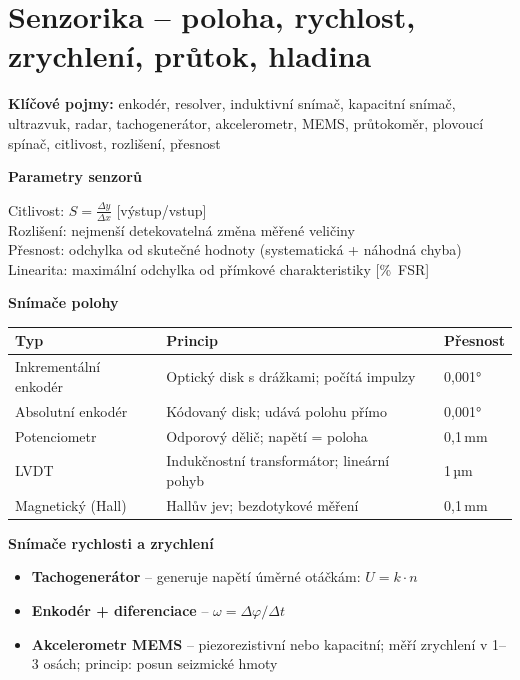 \documentclass[a4paper,10pt]{article}
\begin{document}
\section{Senzorika -- poloha, rychlost, zrychlení, průtok, hladina}

\begin{pojmybox}
\textbf{Klíčové pojmy:}
enkodér, resolver, induktivní snímač, kapacitní snímač,
ultrazvuk, radar, tachogenerátor, akcelerometr, MEMS,
průtokoměr, plovoucí spínač, citlivost, rozlišení, přesnost
\end{pojmybox}

\begin{vysvetlenibox}
\textbf{Parametry senzorů}

\begin{vzorcebox}
Citlivost: $S = \frac{\Delta y}{\Delta x}$ [výstup/vstup]\\
Rozlišení: nejmenší detekovatelná změna měřené veličiny\\
Přesnost: odchylka od skutečné hodnoty (systematická + náhodná chyba)\\
Linearita: maximální odchylka od přímkové charakteristiky [\%~FSR]
\end{vzorcebox}

\textbf{Snímače polohy}

\begin{center}
\begin{tabularx}{0.95\linewidth}{@{} l X l @{}}
    \toprule
    \textbf{Typ} & \textbf{Princip} & \textbf{Přesnost} \\
    \midrule
    Inkrementální enkodér & Optický disk s drážkami; počítá impulzy & 0,001° \\
    Absolutní enkodér     & Kódovaný disk; udává polohu přímo & 0,001° \\
    Potenciometr          & Odporový dělič; napětí = poloha & 0,1\,mm \\
    LVDT                  & Indukčnostní transformátor; lineární pohyb & 1\,µm \\
    Magnetický (Hall)     & Hallův jev; bezdotykové měření & 0,1\,mm \\
    \bottomrule
\end{tabularx}
\end{center}

\textbf{Snímače rychlosti a zrychlení}
\begin{itemize}[noitemsep, leftmargin=1.4em, topsep=4pt]
    \item \textbf{Tachogenerátor} -- generuje napětí úměrné otáčkám:
          $U = k \cdot n$
    \item \textbf{Enkodér + diferenciace} -- $\omega = \Delta\varphi / \Delta t$
    \item \textbf{Akcelerometr MEMS} -- piezorezistivní nebo kapacitní;
          měří zrychlení v 1--3 osách; princip: posun seizmické hmoty
\end{itemize}


\end{vysvetlenibox}
\end{document}
